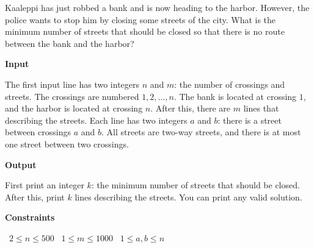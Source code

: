 Kaaleppi has just robbed a bank and is now heading to the harbor. However, the police wants to stop him by closing some streets of the city.
What is the minimum number of streets that should be closed so that there is no route between the bank and the harbor?

\vspace{0.3cm}\noindent\textbf{Input}

The first input line has two integers $n$ and $m$: the number of crossings and streets. The crossings are numbered $1,2,\dots,n$. The bank is located at crossing $1$, and the harbor is located at crossing $n$.
After this, there are $m$ lines that describing the streets. Each line has two integers $a$ and $b$: there is a street between crossings $a$ and $b$. All streets are two-way streets, and there is at most one street between two crossings.

\vspace{0.3cm}\noindent\textbf{Output}

First print an integer $k$: the minimum number of streets that should be closed. After this, print $k$ lines describing the streets. You can print any valid solution.

\vspace{0.3cm}\noindent\textbf{Constraints}

\textbullet\ $2 \le n \le 500$
\textbullet\ $1 \le m \le 1000$
\textbullet\ $1 \le a,b \le n$